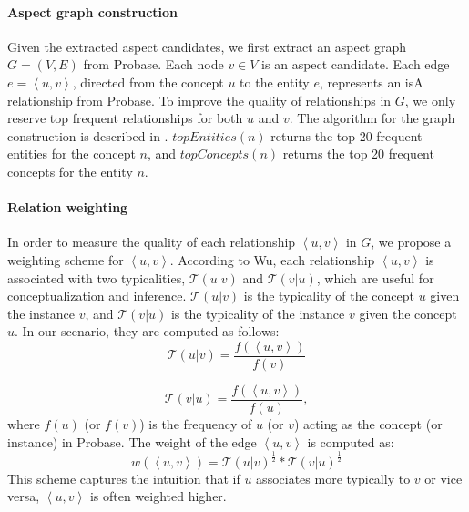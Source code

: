 \paragraph{Aspect graph construction}
Given the extracted aspect candidates,
we first extract an aspect graph $G=(V, E)$ from Probase.
Each node $v\in V$ is an aspect candidate.
Each edge $e=\left\langle u,v\right\rangle$,
directed from the concept $u$ to the entity $e$,
represents an isA relationship from Probase.
To improve the quality of relationships in $G$,
we only reserve top frequent relationships
for both $u$ and $v$. The algorithm for the graph
construction is described in .
 $topEntities(n)$ returns the top 20 frequent entities
 for the concept $n$, and $topConcepts(n)$ returns
 the top 20 frequent concepts for the entity $n$.
 

\paragraph{Relation weighting}
In order to measure the quality of each relationship 
$\left\langle u,v \right\rangle$ in $G$,
we propose a weighting scheme for 
$\left\langle u,v \right\rangle$.
According to Wu\cite{wu2012probase}, 
each relationship $\left\langle u,v \right\rangle$ 
is associated with 
two typicalities, $\mathcal{T}(u|v)$ and $\mathcal{T}(v|u)$,
which are useful for 
conceptualization and inference.
$\mathcal{T}(u|v)$ is the typicality of the concept $u$
given the instance $v$, and
$\mathcal{T}(v|u)$ is the typicality of the instance $v$ given 
the concept $u$.
In our scenario, they are computed as follows:
\begin{equation}
	\mathcal{T}(u|v) = \frac{f(\left\langle u,v \right\rangle)}{f(v)}
\end{equation}

\begin{equation}
\mathcal{T}(v|u) = \frac{f(\left\langle u,v \right\rangle)}{f(u)},
\end{equation}
where $f(u)$ (or $f(v)$) is the frequency of $u$ (or $v$)
acting as the concept (or instance) in Probase.
The weight of the edge $\left\langle u,v \right\rangle$
is computed as:
\begin{equation}
	w(\left\langle u,v \right\rangle) = \mathcal{T}(u|v)^{\frac{1}{2}} *\mathcal{T}(v|u)^{\frac{1}{2}}
	\label{eq:weighing}
\end{equation}
This scheme captures the intuition
that if $u$ associates more typically to $v$ or vice versa,
$\left\langle u,v \right\rangle$ is often weighted higher. 
